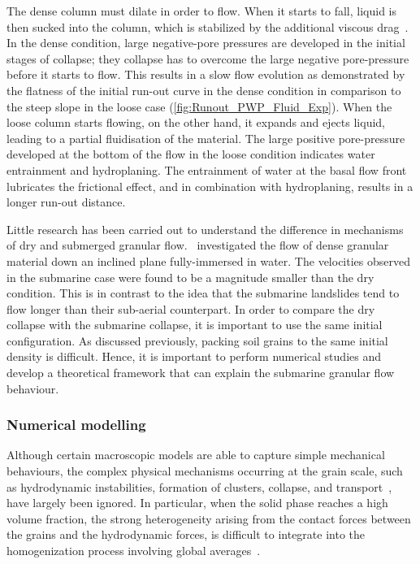 The dense column must dilate in order to flow. 
When it starts to fall, liquid is then sucked into the column, which is 
stabilized by the additional viscous drag~\citep{Rondon2011,Topin2012}. In the 
dense condition, large negative-pore pressures are developed in the initial 
stages of collapse; they collapse has to overcome the large negative 
pore-pressure before it starts to flow. This results in a slow flow evolution 
as demonstrated by the flatness of the initial run-out curve in the dense 
condition in comparison to the steep slope in the loose case 
(\cref{fig:Runout_PWP_Fluid_Exp}). When the loose column starts flowing, on the 
other hand, it expands and ejects liquid, leading to a partial 
fluidisation of the material. The large positive pore-pressure 
developed at the bottom of the flow in the loose condition indicates water 
entrainment and hydroplaning. The entrainment of water at the basal flow front 
lubricates the frictional effect, and in combination with hydroplaning,  
results in a longer run-out distance.

Little research has been carried out to understand the difference in 
mechanisms of dry and submerged granular flow.~\citet{Cassar2005} investigated 
the flow of dense granular material down an 
inclined plane fully-immersed in water. The velocities observed in the 
submarine case were found to be a magnitude smaller than the dry condition. 
This is in contrast to the idea that the submarine landslides tend to flow 
longer than their sub-aerial counterpart. In order to compare the dry collapse 
with the submarine collapse, it is important to use the same initial 
configuration. As discussed previously, packing soil grains to the same initial 
density is difficult. Hence, it is important to perform numerical studies and 
develop a theoretical framework that can explain the submarine granular flow 
behaviour. 


\subsubsection{Numerical modelling}

Although certain macroscopic models are able to capture simple mechanical 
behaviours, the complex physical mechanisms occurring at the 
grain scale, such as hydrodynamic instabilities, formation of clusters, 
collapse, and transport~\citep{Peker2007,Topin2011}, have largely been ignored. 
In particular, when the solid phase reaches a high volume fraction, the strong 
heterogeneity arising from the contact forces between the grains and the 
hydrodynamic forces, is difficult to integrate into the homogenization process 
involving global averages~\citep{Topin2011}. 

